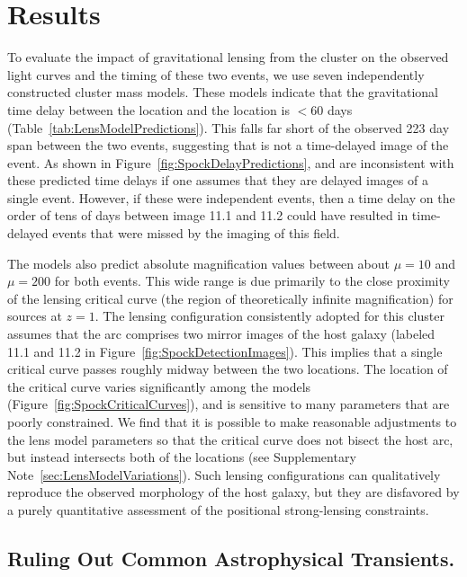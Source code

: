 \section{Results}\label{sec:Results}

To evaluate the impact of gravitational lensing from the 
cluster on the observed light curves and the timing of these two
events, we use seven independently constructed cluster mass models.
These models indicate that the gravitational time delay between the
\spockone location and the \spocktwo location is $<$60 days
(Table~\ref{tab:LensModelPredictions}).  This falls far short of the
observed 223 day span between the two events, suggesting that
\spocktwo is not a time-delayed image of the \spockone event.  As
shown in Figure~\ref{fig:SpockDelayPredictions}, \spockone and
\spocktwo are inconsistent with these predicted time delays if one
assumes that they are delayed images of a single event.  However, if
these were independent events, then a time delay on the order of tens
of days between image 11.1 and 11.2 could have resulted in
time-delayed events that were missed by the \HST imaging of this
field.

The models also predict absolute magnification values between about
$\mu=10$ and $\mu=200$ for both events. This wide range is due
primarily to the close proximity of the lensing critical curve (the
region of theoretically infinite magnification) for sources at $z=1$.
The lensing configuration consistently adopted for this cluster
assumes that the arc comprises two mirror images of the host galaxy
(labeled 11.1 and 11.2 in
Figure~\ref{fig:SpockDetectionImages})\cite{Zitrin:2013a, Jauzac:2014,
  Johnson:2014, Richard:2014, Diego:2015a, Grillo:2015, Hoag:2016,
  Sebesta:2016, Caminha:2017}.  This implies that a single critical
curve passes roughly midway between the two \spock locations.  The
location of the critical curve varies significantly among the models
(Figure~\ref{fig:SpockCriticalCurves}), and is sensitive to many
parameters that are poorly constrained. We find that it is possible to
make reasonable adjustments to the lens model parameters so that the
critical curve does not bisect the \spock host arc, but instead
intersects both of the \spock locations (see Supplementary
Note~\ref{sec:LensModelVariations}).  Such lensing configurations can
qualitatively reproduce the observed morphology of the \spock host
galaxy, but they are disfavored by a purely quantitative assessment of
the positional strong-lensing constraints.

\subsection{Ruling Out Common Astrophysical Transients.}

